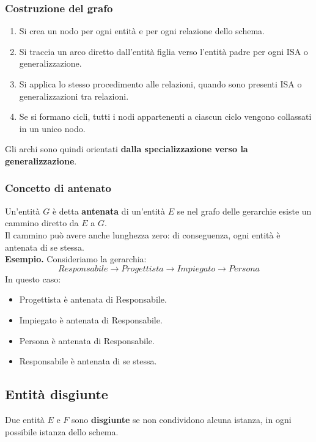 \subsubsection*{Costruzione del grafo}

\begin{enumerate}
    \item Si crea un nodo per ogni entità e per ogni relazione dello schema.
    \item Si traccia un arco diretto dall'entità figlia verso l'entità padre per ogni ISA o generalizzazione.
    \item Si applica lo stesso procedimento alle relazioni, quando sono presenti ISA o generalizzazioni tra relazioni.
    \item Se si formano cicli, tutti i nodi appartenenti a ciascun ciclo vengono collassati in un unico nodo.
\end{enumerate}
\noindent
Gli archi sono quindi orientati \textbf{dalla specializzazione verso la generalizzazione}.

\subsubsection*{Concetto di antenato}

Un'entità $G$ è detta \textbf{antenata} di un'entità $E$ se nel grafo delle gerarchie esiste un cammino diretto da $E$ a $G$.\\
Il cammino può avere anche lunghezza zero: di conseguenza, ogni entità è antenata di se stessa.\medskip\\
\textcolor{verdeEsempio}{\textbf{Esempio. }} Consideriamo la gerarchia:
\[
Responsabile
\longrightarrow
Progettista
\longrightarrow
Impiegato
\longrightarrow
Persona
\]
\noindent
In questo caso:
\begin{itemize}
    \item Progettista è antenata di Responsabile.
    \item Impiegato è antenata di Responsabile.
    \item Persona è antenata di Responsabile.
    \item Responsabile è antenata di se stessa.
\end{itemize}


\subsection{Entità disgiunte}
Due entità $E$ e $F$ sono \textbf{disgiunte} se non condividono alcuna istanza, in ogni possibile istanza dello schema.

